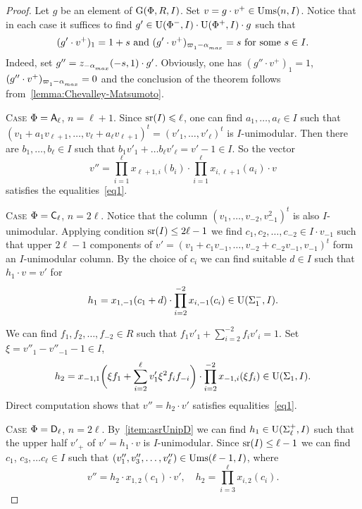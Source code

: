 \begin{proof}

Let $g$ be an element of $\operatorname{G}(\Phi, R, I)$. Set $v=g \cdot v^+\in\operatorname{Ums}(n, I)$. 
Notice that in each case it suffices to find $g' \in \operatorname{U}(\Phi^-, I) \cdot \operatorname{U}(\Phi^+, I) \cdot g$ such that 
\begin{equation} \label{eq1} (g'\cdot v^+)_{1} = 1 + s \text{ and } (g'\cdot v^+)_{\varpi\ssub{1}-\alpha\ssub{max}} = s\ \text{for some}\ s\in I. \end{equation}
Indeed, set $g'' = z_{-\alpha\ssub{max}}(-s, 1) \cdot g'$.
Obviously, one has $(g''\cdot v^+)_1 = 1$, $(g''\cdot v^+)_{\varpi\ssub{1}-\alpha\ssub{max}}=0$ and the conclusion of the theorem follows from~\cref{lemma:Chevalley-Matsumoto}.

\textsc{Case $\Phi=\mathsf{A}_\ell$, $n=\ell + 1$.}
Since $\operatorname{sr}(I)\leqslant\ell$, one can find $a_1,\ldots,a_\ell\in I$ such that $(v_1+a_1v_{\ell+1},\ldots,v_\ell+a_\ell v_{\ell+1})^t=(v'_1,\ldots,v'_\ell)^t$ is $I$-unimodular. Then there are $b_1,\ldots,b_\ell\in I$ such that $b_1v'_1+\ldots b_\ell v'_\ell=v'-1\in I$. So the vector
\[ v'' = \prod_{i=1}^\ell x_{\ell+1,i}(b_i) \cdot \prod_{i=1}^\ell x_{i,\ell+1}(a_i) \cdot v \]
satisfies the equalities~\eqref{eq1}.

\textsc{Case $\Phi=\mathsf{C}_\ell$, $n=2\ell$.}
Notice that the column $(v_1,\ldots, v_{-2}, v_{-1}^2)^t$ is also $I$-unimodular.
Applying condition $\operatorname{sr}(I)\leq 2\ell-1$ we find $c_1, c_2, \ldots, c_{-2} \in I \cdot v_{-1}$ such that upper $2\ell -1$ components of $v'=(v_1 + c_1 v_{-1}, \ldots, v_{-2} + c_{-2}v_{-1}, v_{-1})^t$ form an $I$-unimodular column.
By the choice of $c_i$ we can find suitable $d\in I$ such that $h_1 \cdot v = v'$ for
\[ h_1 = x_{1,-1}(c_1 + d) \cdot \prod_{i=2}^{-2} x_{i,-1}(c_i) \in \operatorname{U}(\Sigma_1^-, I). \]

We can find $f_1, f_2,\ldots, f_{-2} \in R$ such that $f_1v'_1+\sum_{i=2}^{-2} f_i v'_i = 1$.
Set $\xi = v''_1-v''_{-1}-1 \in I$,
\[ h_2 = x_{-1,1}\biggl(\xi f_1 + \sum_{i=2}^\ell v_1' \xi^2 f_i f_{-i}\biggr) \cdot \prod_{i=2}^{-2} x_{-1,i}(\xi f_i) \in \operatorname{U}(\Sigma_1, I). \]
Direct computation shows that $v'' = h_2 \cdot v'$ satisfies equalities~\eqref{eq1}.

\textsc{Case $\Phi=\mathsf{D}_\ell$, $n= 2\ell$.} 
By~\cref{item:asrUnipD} we can find $h_1\in \operatorname{U}(\Sigma^+_\ell, I)$ such that the upper half $v'_+$ of $v'=h_1 \cdot v$ is $I$-unimodular.
Since $\operatorname{sr}(I)\leq \ell-1$ we can find $c_1$, $c_3, \ldots c_\ell \in I$ such that $(v''_1, v''_3, \ldots, v''_\ell) \in \operatorname{Ums}(\ell-1, I)$, where
\[ v''=h_2 \cdot x_{1,2}(c_1) \cdot v', \quad h_2=\prod_{i=3}^\ell x_{i,2}(c_i). \]


\end{proof}
